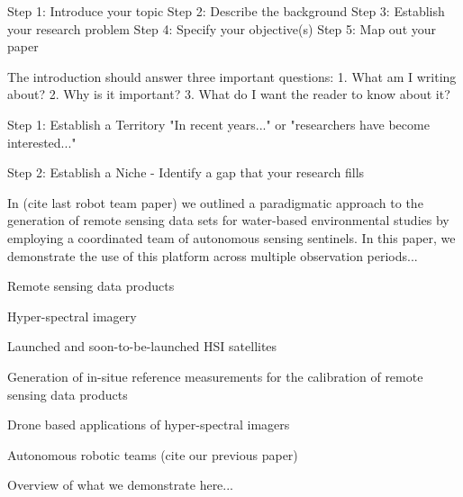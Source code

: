 \documentclass[journal,article,submit,pdftex,moreauthors]{Definitions/mdpi}
\begin{document}
Step 1: Introduce your topic
Step 2: Describe the background
Step 3: Establish your research problem
Step 4: Specify your objective(s)
Step 5: Map out your paper


The introduction should answer three important questions:
1. What am I writing about?
2. Why is it important?
3. What do I want the reader to know about it?

Step 1: Establish a Territory
"In recent years..." or "researchers have become interested..." 

Step 2: Establish a Niche
- Identify a gap that your research fills 



In (cite last robot team paper) we outlined a paradigmatic approach to the generation of remote sensing data sets for water-based environmental studies by employing a coordinated team of autonomous sensing sentinels. In this paper, we demonstrate the use of this platform across multiple observation periods...



Remote sensing data products 

Hyper-spectral imagery

Launched and soon-to-be-launched HSI satellites 

Generation of in-situe reference measurements for the calibration of remote sensing data products 

Drone based applications of hyper-spectral imagers

Autonomous robotic teams (cite our previous paper) 

Overview of what we demonstrate here...

\end{document}
